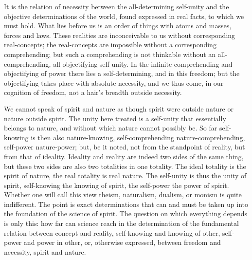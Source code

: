 \documentclass[12pt]{book}
\begin{document}
It is the relation of necessity between the all-determining self-unity and the objective
determinations of the world, found expressed in real facts, to which we must hold. What lies before
us is an order of things with atoms and masses, forces and laws. These realities are inconceivable
to us without corresponding real-concepts; the real-concepts are impossible without a corresponding
comprehending; but such a comprehending is not thinkable without an all-comprehending,
all-objectifying self-unity. In the infinite comprehending and objectifying of power there lies a
self-determining, and in this freedom; but the objectifying takes place with absolute necessity, and
we thus come, in our cognition of freedom, not a hair's breadth outside necessity.

We cannot speak of spirit and nature as though spirit were outside nature or nature outside spirit.
The unity here treated is a self-unity that essentially belongs to nature, and without which nature
cannot possibly be. So far self-knowing is then also nature-knowing, self-comprehending
nature-comprehending, self-power nature-power; but, be it noted, not from the standpoint of reality,
but from that of ideality. Ideality and reality are indeed two sides of the same thing, but these
two sides are also two totalities in one totality. The ideal totality is the spirit of nature, the
real totality is real nature. The self-unity is thus the unity of spirit, self-knowing the knowing
of spirit, the self-power the power of spirit. Whether one will call this view theism, naturalism,
dualism, or monism is quite indifferent. The point is exact determinations that can and must be
taken up into the foundation of the science of spirit. The question on which everything depends is
only this: how far can science reach in the determination of the fundamental relation between concept
and reality, self-knowing and knowing of other, self-power and power in other, or, otherwise
expressed, between freedom and necessity, spirit and nature.
\end{document}
